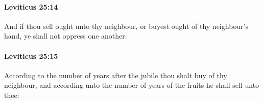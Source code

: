 		\paragraph{Leviticus 25:14} %
			\label{LEVITICUS-25-14}

			And if thou sell ought unto thy neighbour, or buyest ought of thy neighbour’s hand, ye shall not oppress one another:


		\paragraph{Leviticus 25:15} %
			\label{LEVITICUS-25-15}

			According to the number of years after the jubile thou shalt buy of thy neighbour, and according unto the number of years of the fruits he shall sell unto thee:


